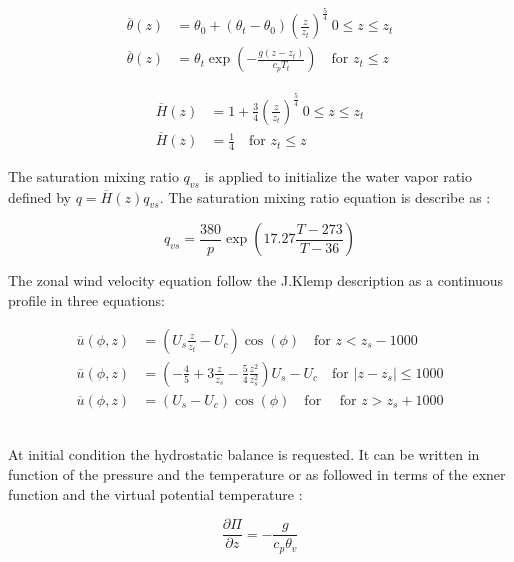 \documentclass[times,doublespace]{fldauth}
\begin{document}
\begin{equation}
\begin{split}
\overline{\theta}(z)&=\theta_0 + (\theta_t - \theta_0)\left(\frac{z}{z_t}\right)^{\frac{5}{4}}  \ 0 \leq z \leq z_t \\
\overline{\theta}(z)&=\theta_t \exp\left(-\frac{g(z-z_t)}{c_pT_{t}}\right) \text{ ~~for   }  z_t \leq z
\end{split}
\end{equation}

 \begin{equation}
\begin{split}
\overline{H}(z)&=1 + \frac{3}{4}\left(\frac{z}{z_t}\right)^{\frac{5}{4}}  \ 0 \leq z \leq z_t \\
\overline{H}(z)&= \frac{1}{4} \text{ ~~for   }  z_t \leq z
\end{split}
\end{equation}

The saturation mixing ratio $q_{vs}$ is applied to initialize the water vapor ratio defined by $q = \overline{H}(z) q_{vs} $. The saturation mixing ratio equation is describe as :

 \begin{equation}
q_{vs}=\frac{380}{p}\exp\left(17.27\frac{ T-273}{T-36}\right)
\end {equation}

The zonal wind velocity equation follow the J.Klemp description as a continuous profile in three equations:

\begin{equation}
\begin{split}
\overline{u}(\phi,z)&=\left(U_s\frac{z}{z_t}-U_c\right)\cos(\phi)  \text{ ~~for   } z < z_s-1000 \\
\overline{u}(\phi,z)&=\left(-\frac{4}{5}+3\frac{z}{z_s}-\frac{5}{4}\frac{z^2}{z_s^2}\right)U_s-U_c \text{ ~~for   }  |z-z_s| \leq 1000 \\
\overline{u}(\phi,z)&=\left(U_s-U_c\right)\cos(\phi)  \text{ ~~for   } \text{ ~~for   }  z > z_s+1000 
\end{split}
\end{equation}



~\\ At initial condition the hydrostatic balance is requested. It can be written in function of the pressure and the temperature or as followed in terms of the exner function and the virtual potential temperature :

  \begin{equation}
 \frac{\partial{\Pi}}{\partial z} = - \frac{g}{c_p\theta_v}
 \end {equation}
\end{document}
